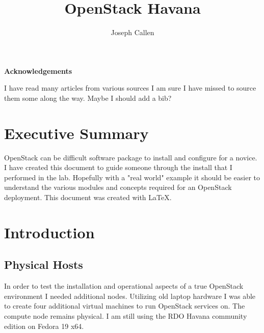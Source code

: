 \documentclass[11pt,letterpaper,oneside]{book}
\title{OpenStack Havana}
\author{Joseph Callen}
\begin{document}
\frontmatter


\maketitle
\newenvironment{acknowledgements}%
    {\cleardoublepage\thispagestyle{empty}\null\vfill\begin{center}%
    \bfseries Acknowledgements\end{center}}%
    {\vfill\null}
        \begin{acknowledgements}
        I have read many articles from various sources I am sure I have missed to source them some along the way.  Maybe I should add a bib? 
        \end{acknowledgements}
\tableofcontents
\listoffigures
\listoftables
\lstlistoflistings
\mainmatter

\chapter*{Executive Summary}
OpenStack can be difficult software package to install and configure for a novice.  I have created this document to guide someone through the install that I performed in the lab.  Hopefully with a "real world" example it should be easier to understand the various modules and concepts required for an OpenStack deployment.  This document was created with \LaTeX.

\chapter{Introduction}
\section{Physical Hosts}
In order to test the installation and operational aspects of a true OpenStack environment I needed additional nodes.  Utilizing old laptop hardware I was able to create four additional virtual machines to run OpenStack services on.  The compute node remains physical.  I am still using the RDO Havana community edition on Fedora 19 x64.\\
\end{document}
